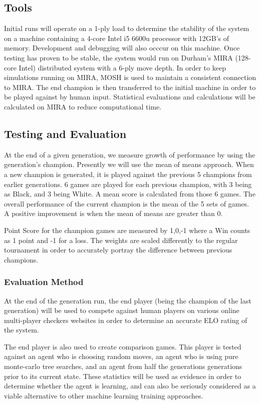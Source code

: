 \documentclass[12pt,a4paper]{article}
\begin{document}
    \subsection*{Tools}

    Initial runs will operate on a 1-ply load to determine the stability of the system on a machine containing a 4-core Intel i5 6600u processor with 12GB's of memory. Development and debugging will also occcur on this machine. Once testing has proven to be stable, the system would run on Durham's MIRA (128-core Intel) distributed system with a 6-ply move depth. In order to keep simulations running on MIRA, MOSH is used to maintain a consistent connection to MIRA. The end champion is then transferred to the initial machine in order to be played against by human input. Statistical evaluations and calculations will be calculated on MIRA to reduce computational time.

\subsection*{Testing and Evaluation}

    At the end of a given generation, we measure growth of performance by using the generation's champion. Presently we will use the mean of means approach. When a new champion is generated, it is played against the previous 5 champions from earlier generations. 6 games are played for each previous champion, with 3 being as Black, and 3 being White. A mean score is calculated from those 6 games. The overall performance of the current champion is the mean of the 5 sets of games. A positive improvement is when the mean of means are greater than 0. 

    Point Score for the champion games are measured by {1,0,-1} where a Win counts as 1 point and -1 for a loss. The weights are scaled differently to the regular tournament in order to accurately portray the difference between previous champions.

    \subsubsection*{Evaluation Method}

    At the end of the generation run, the end player (being the champion of the last generation) will be used to compete against human players on various online multi-player checkers websites in order to determine an accurate ELO rating of the system.

    The end player is also used to create comparison games. This player is tested against an agent who is choosing random moves, an agent who is using pure monte-carlo tree searches, and an agent from half the generations generations prior to its current state. These statistics will be used as evidence in order to determine whether the agent is learning, and can also be seriously considered as a viable alternative to other machine learning training approaches.
\end{document}

